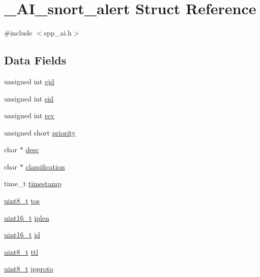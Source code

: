 \hypertarget{struct__AI__snort__alert}{
\section{\_\-AI\_\-snort\_\-alert Struct Reference}
\label{struct__AI__snort__alert}
}


{\ttfamily \#include $<$spp\_\-ai.h$>$}

\subsection*{Data Fields}
\begin{DoxyCompactItemize}
\item 
unsigned int \hyperlink{struct__AI__snort__alert_af8408be5da59cda853442dd13465c0f6}{gid}
\item 
unsigned int \hyperlink{struct__AI__snort__alert_a3349aa68d2234f8ffd897367c3a8a137}{sid}
\item 
unsigned int \hyperlink{struct__AI__snort__alert_a864d3baa48586d6a31639f4cd27d9d37}{rev}
\item 
unsigned short \hyperlink{struct__AI__snort__alert_a25661fa4e212c5e30af5e6a892985ec9}{priority}
\item 
char $\ast$ \hyperlink{struct__AI__snort__alert_ac0902d7c756ec675fb06347ce4706135}{desc}
\item 
char $\ast$ \hyperlink{struct__AI__snort__alert_aa89585e14acb2c4e684a1552d322632f}{classification}
\item 
time\_\-t \hyperlink{struct__AI__snort__alert_a10a67f60ca3da339a2104849a0b2ac19}{timestamp}
\item 
\hyperlink{spp__ai_8h_aba7bc1797add20fe3efdf37ced1182c5}{uint8\_\-t} \hyperlink{struct__AI__snort__alert_a882ae6db43dc0fe08071947ccb044b93}{tos}
\item 
\hyperlink{spp__ai_8h_a273cf69d639a59973b6019625df33e30}{uint16\_\-t} \hyperlink{struct__AI__snort__alert_a523ef8842d01a1bc4ea3c0bf27518e78}{iplen}
\item 
\hyperlink{spp__ai_8h_a273cf69d639a59973b6019625df33e30}{uint16\_\-t} \hyperlink{struct__AI__snort__alert_a45e4acf90450a5f9efd4e0c290f84bcf}{id}
\item 
\hyperlink{spp__ai_8h_aba7bc1797add20fe3efdf37ced1182c5}{uint8\_\-t} \hyperlink{struct__AI__snort__alert_ab9b1ce8ee440a324af116403ac9c51a2}{ttl}
\item 
\hyperlink{spp__ai_8h_aba7bc1797add20fe3efdf37ced1182c5}{uint8\_\-t} \hyperlink{struct__AI__snort__alert_a2a5f2741918c3c13890f2b617a7f23a4}{ipproto}

\end{DoxyCompactItemize}
